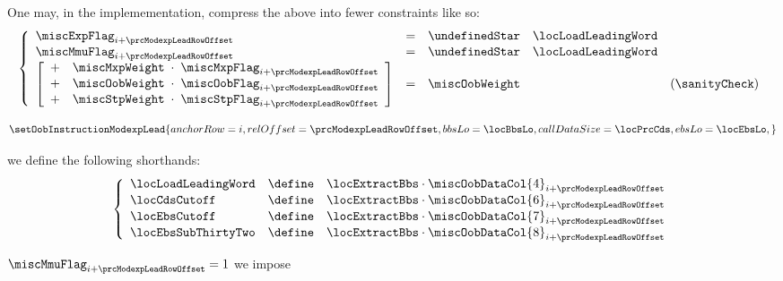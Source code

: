 \begin{description}
\begin{description}
					\saNote{}
					One may, in the implemementation, compress the above into fewer constraints like so:
					\[
						\left\{ \begin{array}{lclr}
							\miscExpFlag _{i + \prcModexpLeadRowOffset} & = & \undefinedStar \quad \locLoadLeadingWord \\
							\miscMmuFlag _{i + \prcModexpLeadRowOffset} & = & \undefinedStar \quad \locLoadLeadingWord \\
							\left[ \begin{array}{cccl}
								+ & \miscMxpWeight & \!\!\!\cdot\!\!\! & \miscMxpFlag _{i + \prcModexpLeadRowOffset} \\
								+ & \miscOobWeight & \!\!\!\cdot\!\!\! & \miscOobFlag _{i + \prcModexpLeadRowOffset} \\
								+ & \miscStpWeight & \!\!\!\cdot\!\!\! & \miscStpFlag _{i + \prcModexpLeadRowOffset} \\
							\end{array} \right]
							& = & \miscOobWeight  & (\sanityCheck) \\
						\end{array} \right.
					\]
				\item[\underline{Setting \oobMod{} values:}] 
					\[
						\setOobInstructionModexpLead {
							anchorRow    = i                       ,
							relOffset    = \prcModexpLeadRowOffset ,
							bbsLo        = \locBbsLo               ,
							callDataSize = \locPrcCds              ,
							ebsLo        = \locEbsLo               ,
							}
					\]
				\item[\underline{Setting some shorthands:}] 
					we define the following shorthands:
					\[
						\left\{ \begin{array}{lcl}
							\locLoadLeadingWord & \define & \locExtractBbs \cdot \miscOobDataCol{4}  _{i + \prcModexpLeadRowOffset} \\
							\locCdsCutoff       & \define & \locExtractBbs \cdot \miscOobDataCol{6}  _{i + \prcModexpLeadRowOffset} \\
							\locEbsCutoff       & \define & \locExtractBbs \cdot \miscOobDataCol{7}  _{i + \prcModexpLeadRowOffset} \\
							\locEbsSubThirtyTwo & \define & \locExtractBbs \cdot \miscOobDataCol{8}  _{i + \prcModexpLeadRowOffset} \\
						\end{array} \right.
					\]
				\item[\underline{Setting \mmuMod{} values:}] 
					\If $\miscMmuFlag_{i + \prcModexpLeadRowOffset} = 1$ \Then we impose

\end{description}
\end{description}
